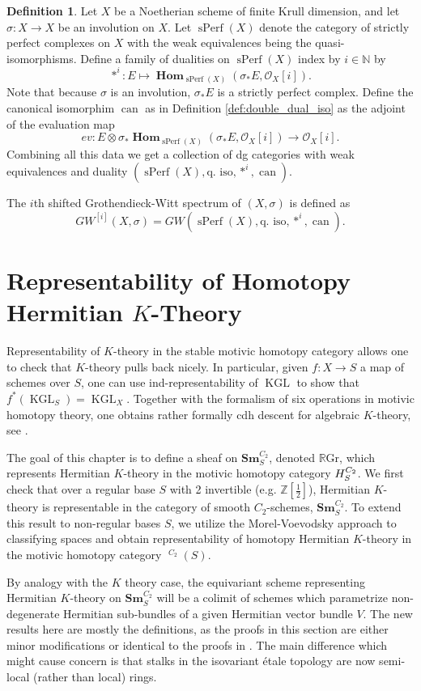 \documentclass[edeposit,fullpage]{uiucthesis2009}
\newcommand{\Z}{\mathbb Z}
\newcommand{\mbb}{\mathbb}
\newcommand{\mc}{\mathcal}
\newcommand{\RGr}{\mathbb R\mathrm{Gr}}
\newcommand{\Sm}[1]{\mathbf{Sm}_{#1}}
\newcommand{\mothom}{\mathbf{H}}
\DeclareMathOperator{\can}{can}
\DeclareMathOperator{\iHom}{\mathbf{Hom}}
\DeclareMathOperator{\sPerf}{sPerf}
\DeclareMathOperator{\KGL}{KGL}
\DeclareMathOperator{\HH}{\underline{H}}
\theoremstyle{plain}
\numberwithin{lemma}{section}
\theoremstyle{definition}
\newtheorem{definition}[lemma]{Definition}
\begin{document}
\begin{definition}
Let $X$ be a Noetherian scheme of finite Krull dimension, and let
$\sigma : X \rightarrow X$ be an involution on $X$. Let $\sPerf(X)$
denote the category of strictly perfect complexes on $X$ with the weak
equivalences being the quasi-isomorphisms. Define a family of dualities on
$\sPerf(X)$ index by $i \in \mbb N$ by 
\[
\ast^i : E \mapsto \iHom_{\sPerf(X)}(\sigma_*E,\mc O_X[i]).
\]
Note that because $\sigma$ is an involution, $\sigma_*E$ is a
strictly perfect complex. Define the canonical isomorphim $\can$ as in Definition
\ref{def:double_dual_iso} as the adjoint of the evaluation map
\[
ev : E \otimes \sigma_*\iHom_{\sPerf(X)}(\sigma_* E, \mc O_X[i])
\rightarrow \mc O_X[i].
\]
Combining all this data we get a collection of dg categories with weak equivalences
and duality $(\sPerf(X),\text{q. iso}, \ast^i,\can)$.

The $i$th shifted Grothendieck-Witt spectrum of $(X,\sigma)$ is
defined as
\[
GW^{[i]}(X,\sigma) = GW (\sPerf(X),\text{q. iso}, \ast^i,\can).
\]
\end{definition}

\chapter{Representability of Homotopy Hermitian $K$-Theory}\label{chap:herm_grass}


Representability of $K$-theory in the stable motivic homotopy category
allows one to check that $K$-theory pulls back nicely. In particular,
given $f : X \rightarrow S$ a map of schemes over $S$, one can use
ind-representability of $\KGL$ to show that
$f^*(\KGL_S) = \KGL_X$. Together with the formalism of six operations
in motivic homotopy theory, one obtains rather formally cdh descent for algebraic
$K$-theory, see \cite{DenRep}.

The goal of
this chapter is to define a sheaf on $\Sm{S}^{C_2}$, denoted $\RGr$, which represents
Hermitian $K$-theory in the motivic homotopy category $\mathcal
\mothom_S^{C_2}$. We first check that over a regular base $S$ with 2 invertible
(e.g. $\Z[\frac{1}{2}]$), Hermitian $K$-theory is representable in the
category of smooth $C_2$-schemes, $\Sm{S}^{C_2}$. To
extend this result to non-regular bases $S$, we utilize the
Morel-Voevodsky approach to classifying spaces and obtain
representability of homotopy Hermitian $K$-theory in the motivic homotopy category $\HH^{C_2}(S)$.

By analogy with the $K$ theory case, the equivariant scheme
representing Hermitian $K$-theory on $\Sm{S}^{C_2}$ will be a colimit of schemes
which parametrize non-degenerate Hermitian sub-bundles of a given
Hermitian vector bundle $V$. The new results here are mostly the
definitions, as the proofs in this section are either
minor modifications or identical to the proofs in \cite{SchTri}. The
main difference which might cause concern is that stalks in the
isovariant \'etale topology are now semi-local (rather than
local) rings. 
\end{document}
